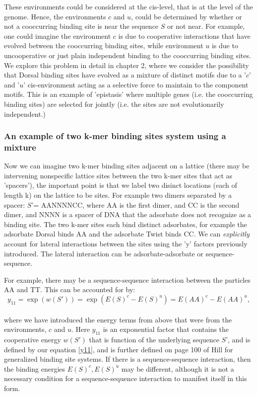 These environments could be considered at the cis-level, that is at the level of the genome.  Hence, the environments $c$ and $u$, could be determined by whether or not a cooccurring binding site is near the sequence $S$ or not near.  For example, one could imagine the environment $c$ is due to cooperative interactions that have evolved between the cooccurring binding sites, while environment $u$ is due to uncooperative or just plain independent binding to the cooccurring binding sites.  We explore this problem in detail in chapter 2, where we consider the possibility that Dorsal binding sites have evolved as a mixture of distinct motifs due to a '$c$' and '$u$' cis-environment acting as a selective force to maintain to the component motifs.  This is an example of 'epistasis' where multiple genes (i.e. the cooccurring binding sites) are selected for jointly (i.e. the sites are not evolutionarily independent.)

\subsubsection{An example of two k-mer binding sites system using a mixture}
Now we can imagine two k-mer binding sites adjacent on a lattice (there may be intervening nonspecific lattice sites between the two k-mer sites that act as 'spacers'), the important point is that we label two disinct locations (each of length k) on the lattice to be sites.  For example two dimers separated by a spacer: $S$'= AANNNNCC, where AA is the first dimer, and CC is the second dimer, and NNNN is a spacer of DNA that the adsorbate does not recognize as a binding site.  The two k-mer sites each bind distinct adsorbates, for example the adsorbate Dorsal binds AA and the adsorbate Twist binds CC.  We can \textit{explicitly} account for lateral interactions between the sites using the 'y' factors previously introduced.  The lateral interaction can be adsorbate-adsorbate or sequence-sequence.

For example, there may be a sequence-sequence interaction between the particles AA and TT.  This can be accounted for by:
\begin{equation}\label{}
  y_{11} =\exp( w(S') ) = \exp( E(S)^c - E(S)^u )= E(AA)^c-E(AA)^u,
\end{equation}
\\
where we have introduced the energy terms from above that were from the environments, $c$ and $u$. Here $y_{11}$ is an exponential factor that contains the cooperative energy $w(
S')$ that is function of the underlying sequence $S$', and is defined by our equation \eqref{y11}, and is further defined on page 100 of Hill\cite{hill} for generalized binding site systems.  If there is a sequence-sequence interaction, then the binding energies $E(S)^c, E(S)^u$ may be different, although it is not a necessary condition for a sequence-sequence interaction to manifest itself in this form.

